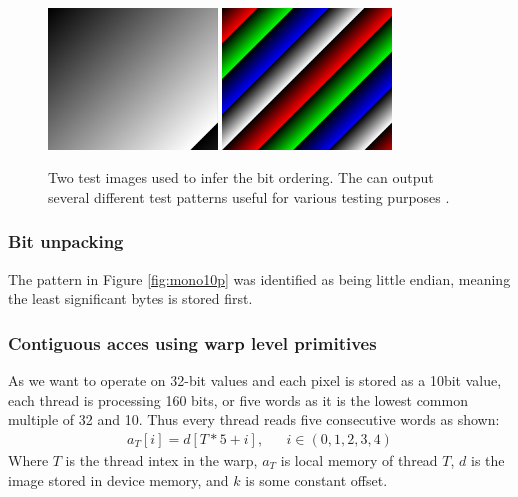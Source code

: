 \begin{figure}[H]
    \centering
    \includegraphics[width=0.4\textwidth]{figures/unpacking/test_pattern0.jpg}
    \includegraphics[width=0.4\textwidth]{figures/unpacking/test_pattern2.jpg}
    \caption{Two test images used to infer the bit ordering.
        The \cam can output several different test patterns useful for various testing purposes \cite{lucidvisionlabsTritonMPPolarized2020}.}
    \label{fig:test_pattern}
\end{figure}


\subsubsection{Bit unpacking} \label{sec:contuguous_access}
The pattern in Figure \ref{fig:mono10p} was identified as being little endian, meaning the least significant bytes is stored first.


\subsubsection{Contiguous acces using warp level primitives} \label{sec:contuguous_access}
As we want to operate on 32-bit values and each pixel is stored as a 10bit value, each thread is processing 160 bits, or five words as it is the lowest common multiple of 32 and 10.
Thus every thread reads five consecutive words as shown:
\begin{align}
    a_T[i] = d[T*5+i], &  & i \in (0,1,2,3,4)
\end{align}
Where $T$ is the thread intex in the warp, $a_T$ is local memory of thread $T$, $d$ is the image stored in device memory, and $k$ is some constant offset.






